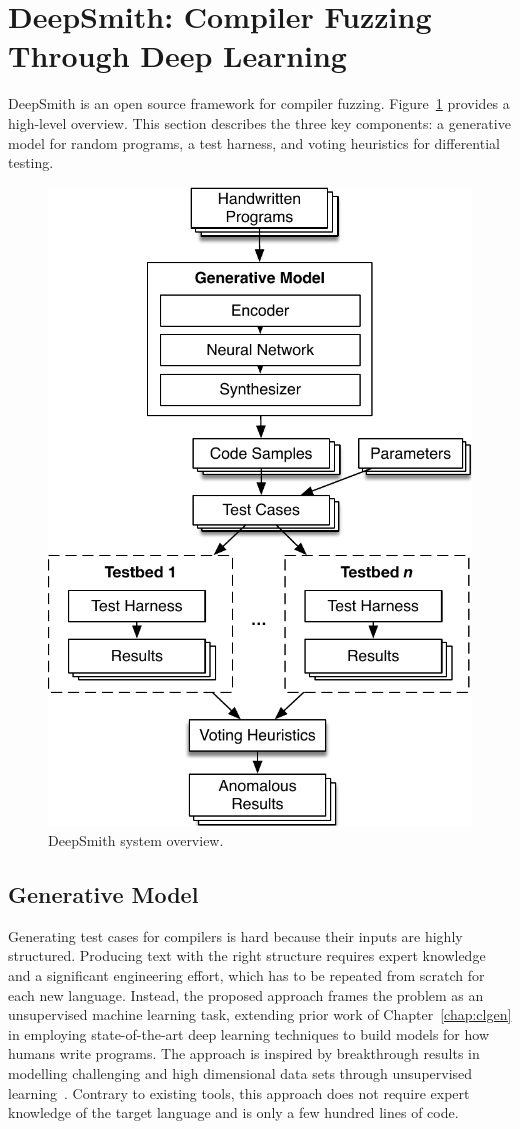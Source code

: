 \section{DeepSmith: Compiler Fuzzing Through Deep Learning}
\label{sec:deepsmith}

DeepSmith is an open source framework for compiler fuzzing. Figure~\ref{fig:deepsmith} provides a high-level overview. This section describes the three key components: a generative model for random programs, a test harness, and voting heuristics for differential testing.

\begin{figure}
  \centering
  \includegraphics[width=.7\columnwidth]{img/deepsmith}
  \caption[DeepSmith system overview]{%
    DeepSmith system overview.
  }%
  \label{fig:deepsmith}
\end{figure}

\subsection{Generative Model}

Generating test cases for compilers is hard because their inputs are highly structured. Producing text with the right structure requires expert knowledge and a significant engineering effort, which has to be repeated from scratch for each new language. Instead, the proposed approach frames the problem as an unsupervised machine learning task, extending prior work of Chapter~\ref{chap:clgen} in employing state-of-the-art deep learning techniques to build models for how humans write programs. The approach is inspired by breakthrough results in modelling challenging and high dimensional data sets through unsupervised learning~\cite{Raghu2016,Radford2016b,Bowman2015}. Contrary to existing tools, this approach does not require expert knowledge of the target language and is only a few hundred lines of code.

